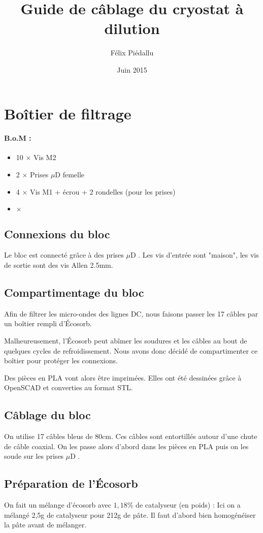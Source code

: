 \documentclass[a4paper,11pt]{article}
\title{Guide de câblage du cryostat à dilution}
\author{Félix Piédallu}
\date{Juin 2015}
\newcommand{\fois}{$\times$ }
\newcommand{\uD}{$\mu$D }
\newenvironment{BOM}
  {%
    \paragraph{B.o.M : } \begin{itemize}%
  }{%
    \end{itemize}\medskip%
  }
\begin{document}
\maketitle
\tableofcontents

\section{Boîtier de filtrage}

\begin{BOM}
    \item 10 \fois Vis M2
    \item 2 \fois Prises \uD femelle
    \item 4 \fois Vis M1 + écrou + 2 rondelles (pour les prises)
    \item \fois 
\end{BOM}

\subsection{Connexions du bloc}
Le bloc est connecté grâce à des prises \uD. Les vis d'entrée sont "maison", les vis de sortie sont des vis Allen 2.5mm.

\subsection{Compartimentage du bloc}
Afin de filtrer les micro-ondes des lignes DC, nous faisons passer les 17 câbles par un boîtier rempli d'Écosorb.

Malheureusement, l'Écosorb peut abîmer les soudures et les câbles au bout de quelques cycles de refroidissement. Nous avons donc décidé de compartimenter ce boîtier pour protéger les connexions.

Des pièces en PLA vont alors être imprimées. Elles ont été dessinées grâce à OpenSCAD et converties au format STL.

\subsection{Câblage du bloc}
On utilise 17 câbles bleus de 80cm. Ces câbles sont entortillés autour d'une chute de câble coaxial. On les passe alors d'abord dans les pièces en PLA puis on les soude sur les prises \uD.

\subsection{Préparation de l'Écosorb}
On fait un mélange d'écosorb avec $1,18\%$ de catalyseur (en poids) : Ici on a mélangé 2,5g de catalyseur pour 212g de pâte. Il faut d'abord bien homogénéiser la pâte avant de mélanger.
\end{document}
